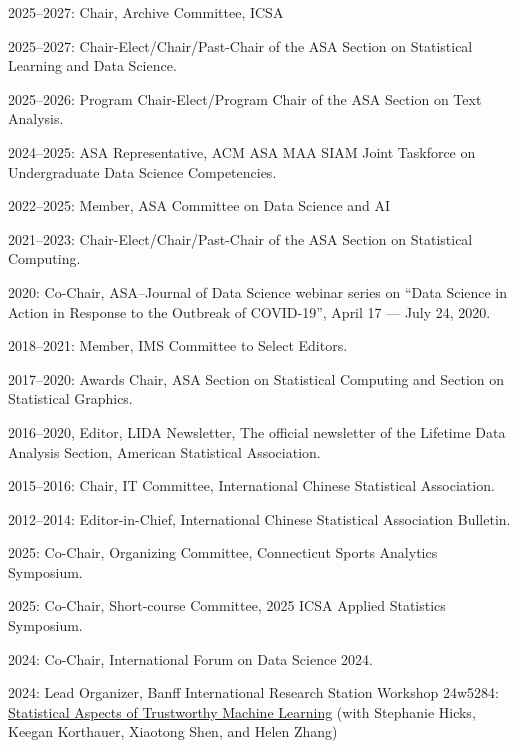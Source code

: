 \documentclass[Statistics]{vita}
\begin{document}
\begin{vita}
\begin{Services}
\begin{Editorial}
  \end{Editorial}
  \begin{SocietyService}
  \item 2025--2027: Chair, Archive Committee, ICSA
  \item 2025--2027: Chair-Elect/Chair/Past-Chair of the ASA Section on Statistical Learning and Data Science.
  \item 2025--2026: Program Chair-Elect/Program Chair of the ASA Section on Text Analysis.
  \item 2024--2025: ASA Representative, ACM ASA MAA SIAM Joint Taskforce on Undergraduate Data Science Competencies.
  \item 2022--2025: Member, ASA Committee on Data Science and AI
  \item 2021--2023: Chair-Elect/Chair/Past-Chair of the ASA Section on Statistical Computing.
  \item 2020: Co-Chair, ASA--Journal of Data Science webinar series on ``Data Science in Action in Response to the Outbreak of COVID-19'', April 17 --- July 24, 2020.
  \item 2018--2021: Member, IMS Committee to Select Editors.
  \item 2017--2020: Awards Chair, ASA Section on Statistical Computing and Section on Statistical Graphics.
  \item 2016--2020, Editor, LIDA Newsletter, The official newsletter of the Lifetime Data Analysis Section, American Statistical Association.
  \item 2015--2016: Chair, IT Committee, International Chinese Statistical Association.
  \item 2012--2014: Editor-in-Chief, International Chinese Statistical Association Bulletin.
  \end{SocietyService}
  \begin{Conferences}
  \item 2025: Co-Chair, Organizing Committee, Connecticut Sports Analytics Symposium.
  \item 2025: Co-Chair, Short-course Committee, 2025 ICSA Applied Statistics Symposium.
  \item 2024: Co-Chair, International Forum on Data Science 2024.
  \item 2024: Lead Organizer, Banff International Research Station Workshop 24w5284: \href{http://www.birs.ca/event/24w5284}{Statistical Aspects of Trustworthy Machine Learning} (with Stephanie Hicks, Keegan Korthauer, Xiaotong Shen, and Helen Zhang)

\end{Conferences}
\end{Services}
\end{vita}
\end{document}
